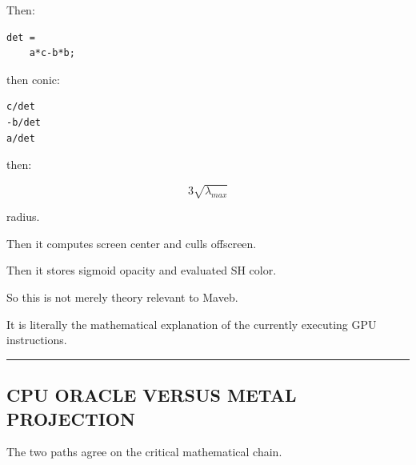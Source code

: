 Then:

\protect{}\label{tf2x2w}%
\begin{verbatim}
det =
    a*c-b*b;
\end{verbatim}

then conic:

\protect{}\label{qebz4r}%
\begin{verbatim}
c/det
-b/det
a/det
\end{verbatim}

then:

\[
3\sqrt{\lambda_{max}}
\]

radius.

Then it computes screen center and culls offscreen.

Then it stores sigmoid opacity and evaluated SH color.

So this is not merely theory relevant to Maveb.

It is literally the mathematical explanation of the currently executing GPU instructions.

\begin{center}\rule{0.5\linewidth}{0.5pt}\end{center}

\subsection{CPU ORACLE VERSUS METAL PROJECTION}\label{04-visual-computing-ii-ch038-cpu-oracle-versus-metal-projection}

\hypertarget{04-visual-computing-ii-ch038-cpu-oracle-versus-metal-projection}{}

The two paths agree on the critical mathematical chain.


